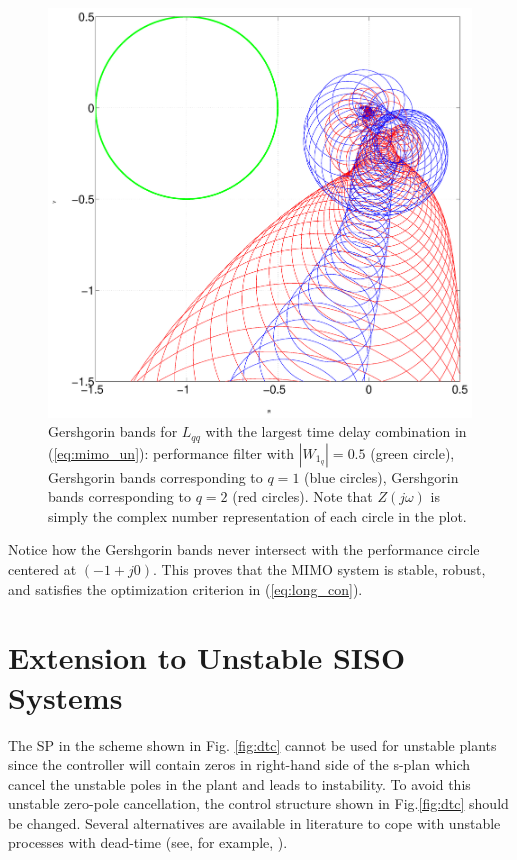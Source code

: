 \documentclass[default]{svmult}
\begin{document}
\begin{figure}[H]
\vspace{-0.7cm}
\centering
{}
\centerline{\includegraphics[scale=0.18]{fig/gersh.eps}}
\caption{Gershgorin bands for $L_{qq}$ with the largest time delay combination in (\ref{eq:mimo_un}): performance filter with $|W_{1_{q}}|=0.5$ (green circle), Gershgorin bands corresponding to $q=1$ (blue circles), Gershgorin bands corresponding to $q=2$ (red circles). Note that $Z(j\omega)$ is simply the complex number representation of each circle in the plot.}
\label{fig:mimo2}
\end{figure}
Notice how the Gershgorin bands never intersect with the performance circle centered at $(-1+j0)$. This proves that the MIMO system is stable, robust, and satisfies the optimization criterion in (\ref{eq:long_con}).  
\section{Extension to Unstable SISO Systems}
\label{sec:4}
The SP in the scheme shown in Fig. \ref{fig:dtc} cannot be used for unstable plants since the controller will contain zeros in right-hand side of the s-plan which cancel the unstable poles in the plant and leads to instability. 
To avoid this unstable zero-pole cancellation, the control structure shown in Fig.\ref{fig:dtc} should be changed. 
Several alternatives are available in literature to cope with unstable processes with dead-time (see, for example, \cite{Dep85,MA98,LCGZ05,NC07,NC09}).  
\end{document}
